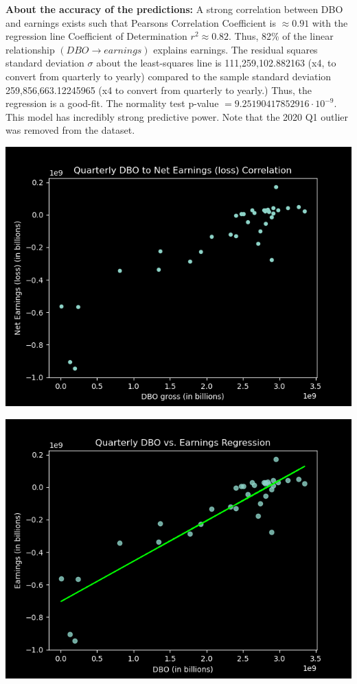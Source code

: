 \documentclass{article}
\begin{document}
\vspace{0.2cm}
\textbf{About the accuracy of the predictions:}
A strong correlation between DBO and earnings exists such that Pearsons 
Correlation Coefficient is $\approx 0.91$ with the regression line Coefficient of 
Determination $r^{2} \approx 0.82$. Thus, 82\% of the linear relationship 
$(DBO \rightarrow earnings)$ explains earnings. The residual squares standard 
deviation $\sigma$ about the least-squares line is 111,259,102.882163 (x4, to 
convert from quarterly to yearly) compared to the sample standard deviation 
259,856,663.12245965 (x4 to convert from quarterly to yearly.) Thus, the 
regression is a good-fit. The normality test p-value 
$= 9.25190417852916 \cdot 10^{-9}$. This model has incredibly strong predictive 
power. Note that the 2020 Q1 outlier was removed from the dataset.
\newpage
\begin{center}
    \includegraphics[scale=0.9]{correlation.png}
\end{center}
\begin{center}
    \includegraphics[scale=0.9]{regression.png}
\end{center}
\end{document}
